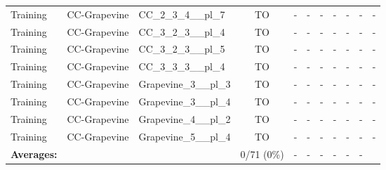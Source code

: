 \documentclass{article}
\begin{document}
\begin{tabular}{lllcccccccc}
Training & CC-Grapevine & CC\_2\_3\_4\_\_pl\_7 & TO & - & - & - & - & - & - & - \\
Training & CC-Grapevine & CC\_3\_2\_3\_\_pl\_4 & TO & - & - & - & - & - & - & - \\
Training & CC-Grapevine & CC\_3\_2\_3\_\_pl\_5 & TO & - & - & - & - & - & - & - \\
Training & CC-Grapevine & CC\_3\_3\_3\_\_pl\_4 & TO & - & - & - & - & - & - & - \\
Training & CC-Grapevine & Grapevine\_3\_\_pl\_3 & TO & - & - & - & - & - & - & - \\
Training & CC-Grapevine & Grapevine\_3\_\_pl\_4 & TO & - & - & - & - & - & - & - \\
Training & CC-Grapevine & Grapevine\_4\_\_pl\_2 & TO & - & - & - & - & - & - & - \\
Training & CC-Grapevine & Grapevine\_5\_\_pl\_4 & TO & - & - & - & - & - & - & - \\
\textbf{Averages:} & & & 0/71 (0\%) & - & - & - & - & - & - & \\
\bottomrule
\end{tabular}
\newpage
\end{document}
